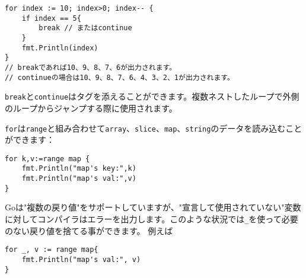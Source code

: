 \begin{lstlisting}[numbers=none]
for index := 10; index>0; index-- {
    if index == 5{
        break // またはcontinue
    }
    fmt.Println(index)
}
// breakであれば10、9、8、7、6が出力されます。
// continueの場合は10、9、8、7、6、4、3、2、1が出力されます。
\end{lstlisting}

\texttt{break}と\texttt{continue}はタグを添えることができます。複数ネストしたループで外側のループからジャンプする際に使用されます。

\texttt{for}は\texttt{range}と組み合わせて\texttt{array}、\texttt{slice}、\texttt{map}、\texttt{string}のデータを読み込むことができます：

\begin{lstlisting}[numbers=none]
for k,v:=range map {
    fmt.Println("map's key:",k)
    fmt.Println("map's val:",v)
}
\end{lstlisting}

Goは"複数の戻り値"をサポートしていますが、"宣言して使用されていない"変数に対してコンパイラはエラーを出力します。このような状況では\texttt{\_}を使って必要のない戻り値を捨てる事ができます。 例えば

\begin{lstlisting}[numbers=none]
for _, v := range map{
    fmt.Println("map's val:", v)
}
\end{lstlisting}


